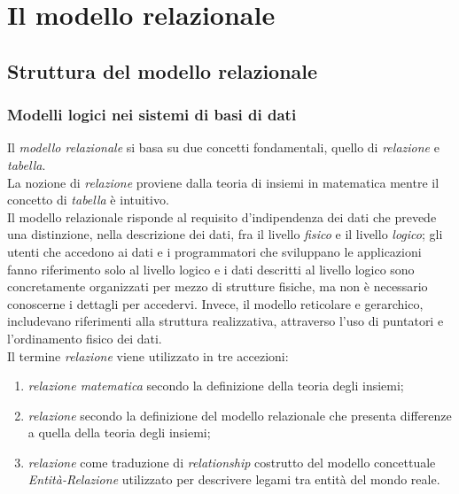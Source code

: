 \documentclass[12pt]{report}
\begin{document}
		\chapter{Il modello relazionale}
		\section{Struttura del modello relazionale}
		\subsection{Modelli logici nei sistemi di basi di dati}
		Il \textit{modello relazionale} si basa su due concetti fondamentali, quello di \textit{relazione} e \textit{tabella}. \\
		La nozione di \textit{relazione} proviene dalla teoria di insiemi in matematica mentre il concetto di \textit{tabella} è intuitivo. \\
		Il modello relazionale risponde al requisito d'indipendenza dei dati che prevede una distinzione, nella descrizione dei dati, fra il livello \textit{fisico} e il livello \textit{logico}; gli utenti che accedono ai dati e i programmatori che sviluppano le applicazioni fanno riferimento solo al livello logico e i dati descritti al livello logico sono concretamente organizzati per mezzo di strutture fisiche, ma non è necessario conoscerne i dettagli per accedervi. Invece, il modello reticolare e gerarchico, includevano riferimenti alla struttura realizzativa, attraverso l'uso di puntatori e l'ordinamento fisico dei dati. \\
		Il termine \textit{relazione} viene utilizzato in tre accezioni:
		\begin{enumerate}
			\item \textit{relazione matematica} secondo la definizione della teoria degli insiemi;
			\item \textit{relazione} secondo la definizione del modello relazionale che presenta differenze a quella della teoria degli insiemi;
			\item \textit{relazione} come traduzione di \textit{relationship} costrutto del modello concettuale \textit{Entità-Relazione} utilizzato per descrivere legami tra entità del mondo reale.
		\end{enumerate}
\end{document}
